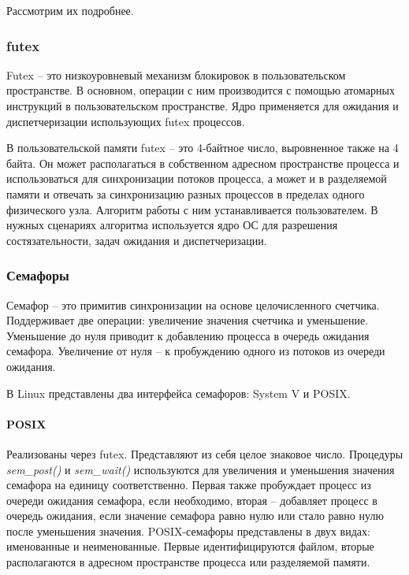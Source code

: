 Рассмотрим их подробнее.

\subsubsection{futex}

Futex \cite{FutexOrigins} -- это низкоуровневый механизм блокировок в пользовательском пространстве. В основном, операции с ним производится с помощью атомарных инструкций в пользовательском пространстве. Ядро применяется для ожидания и диспетчеризации использующих futex процессов.

В пользовательской памяти futex -- это 4-байтное число, выровненное также на 4 байта. Он может располагаться в собственном адресном пространстве процесса и использоваться для синхронизации потоков процесса, а может и в разделяемой памяти и отвечать за синхронизацию разных процессов в пределах одного физического узла. Алгоритм работы с ним устанавливается пользователем. В нужных сценариях алгоритма используется ядро ОС для разрешения состязательности, задач ожидания и диспетчеризации.

\subsubsection{Семафоры}

Семафор -- это примитив синхронизации на основе целочисленного счетчика. Поддерживает две операции: увеличение значения счетчика и уменьшение. Уменьшение до нуля приводит к добавлению процесса в очередь ожидания семафора. Увеличение от нуля -- к пробуждению одного из потоков из очереди ожидания.

В Linux представлены два интерфейса семафоров: System V и POSIX.

\paragraph{POSIX}

Реализованы через futex. Представляют из себя целое знаковое число. Процедуры \textit{sem\_post()} и \textit{sem\_wait()} используются для увеличения и уменьшения значения семафора на единицу соответственно. Первая также пробуждает процесс из очереди ожидания семафора, если необходимо, вторая -- добавляет процесс в очередь ожидания, если значение семафора равно нулю или стало равно нулю после уменьшения значения.
POSIX-семафоры представлены в двух видах: именованные и неименованные. Первые идентифицируются файлом, вторые располагаются в адресном пространстве процесса или разделяемой памяти.

